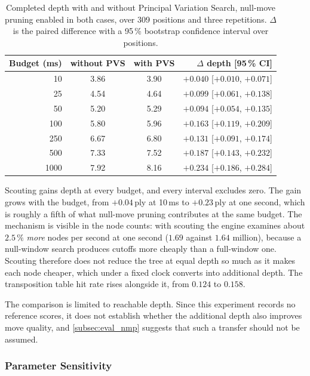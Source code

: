 \begin{table}[ht]
\centering
\begin{tabular}{@{}rccr@{}}
\toprule
Budget (ms) & without PVS & with PVS & $\Delta$ depth [95\,\% CI] \\ \midrule
10   & 3.86 & 3.90 & $+0.040$ [$+0.010$, $+0.071$] \\
25   & 4.54 & 4.64 & $+0.099$ [$+0.061$, $+0.138$] \\
50   & 5.20 & 5.29 & $+0.094$ [$+0.054$, $+0.135$] \\
100  & 5.80 & 5.96 & $+0.163$ [$+0.119$, $+0.209$] \\
250  & 6.67 & 6.80 & $+0.131$ [$+0.091$, $+0.174$] \\
500  & 7.33 & 7.52 & $+0.187$ [$+0.143$, $+0.232$] \\
1000 & 7.92 & 8.16 & $+0.234$ [$+0.186$, $+0.284$] \\ \bottomrule
\end{tabular}
\caption{Completed depth with and without Principal Variation Search, null-move
pruning enabled in both cases, over 309 positions and three repetitions. $\Delta$
is the paired difference with a 95\,\% bootstrap confidence interval over
positions.}
\label{tab:pvs_onoff}
\end{table}

Scouting gains depth at every budget, and every interval excludes zero. The gain
grows with the budget, from $+0.04$\,ply at 10\,ms to $+0.23$\,ply at one second,
which is roughly a fifth of what null-move pruning contributes at the same budget.
The mechanism is visible in the node counts: with scouting the engine examines
about $2.5\,\%$ \emph{more} nodes per second at one second
($1.69$ against $1.64$ million), because a null-window search produces cutoffs
more cheaply than a full-window one. Scouting therefore does not reduce the tree
at equal depth so much as it makes each node cheaper, which under a fixed clock
converts into additional depth. The transposition table hit rate rises alongside
it, from $0.124$ to $0.158$.

The comparison is limited to reachable depth. Since this experiment records no
reference scores, it does not establish whether the additional depth also
improves move quality, and \cref{subsec:eval_nmp} suggests that such a transfer
should not be assumed.

\subsubsection{Parameter Sensitivity}
\label{subsec:eval_pvs_sweep}


